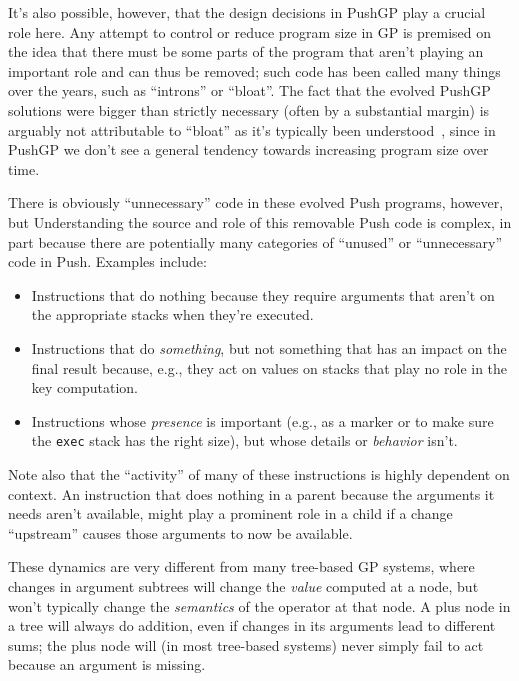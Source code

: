 It's also possible,
however, that the design decisions in PushGP play a crucial role here. Any
attempt to control or reduce program size in GP is premised on the idea that
there must be some parts of the program that aren't playing an important role
and can thus be removed; such code has been called many things over the years,
such as ``introns'' or ``bloat''. The fact that the evolved PushGP solutions
were bigger than strictly necessary (often by a substantial margin) is arguably
not attributable to ``bloat'' as it's typically been 
understood~\cite{poli08:fieldguide}, since in PushGP we don't see a 
general tendency towards increasing program size over time. 

There is obviously ``unnecessary'' code in these evolved Push programs, 
however, but Understanding the source and role of this removable Push 
code is complex, in part because there are potentially many categories 
of ``unused'' or ``unnecessary'' code
in Push. Examples include:
\begin{itemize}
	\item Instructions that do nothing because they require arguments 
	that aren't on the appropriate stacks when they're executed. 
	\item Instructions that do \emph{something}, but not something that has an 
	impact on the final result because, e.g., they act on values on stacks 
	that play no role in the key computation. 
	\item Instructions whose \emph{presence} is important (e.g., as a marker 
	or to make sure the \texttt{exec} stack has the right size), but 
	whose details or \emph{behavior} isn't.
\end{itemize}
Note also that the ``activity'' of many of these instructions is highly
dependent on context. An instruction that does nothing in a parent because
the arguments it needs aren't available, might play a prominent role in a
child if a change ``upstream'' causes those arguments to now be available.

These dynamics are very different from many tree-based GP systems, where
changes in argument subtrees will change the \emph{value} computed at a 
node, but won't typically change the \emph{semantics} of the operator at that
node. A plus node in a tree will always do addition, even if changes in its
arguments lead to different sums; the plus node will (in most tree-based
systems) never simply fail to act because an argument is missing.

